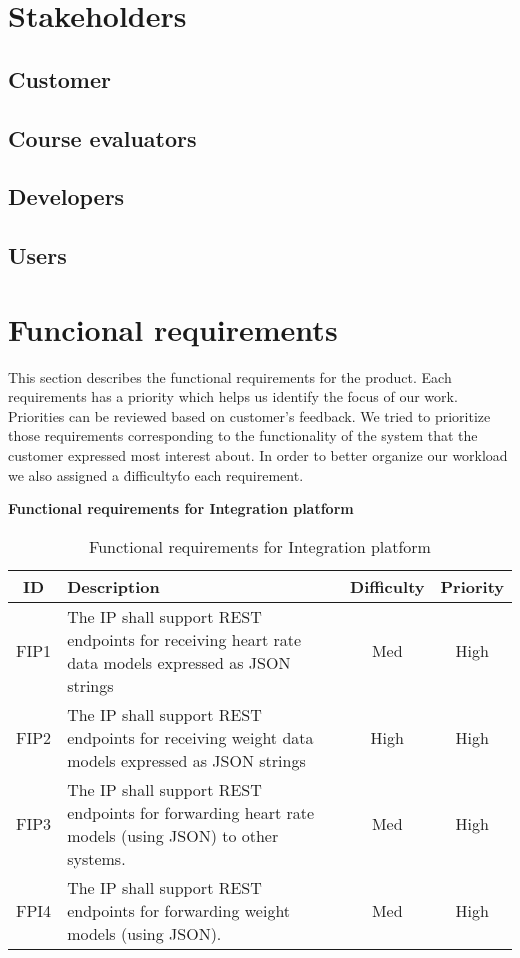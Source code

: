 
\section{Stakeholders}
\label{section:stakeholders}

\subsection{Customer}
\subsection{Course evaluators}
\subsection{Developers}
\subsection{Users}

\newpage
\section{Funcional requirements}
\label{section:functionalreq}

This section describes the functional requirements for the product.
Each requirements has a priority which helps us identify the focus of our work.
Priorities can be reviewed based on customer's feedback. We tried to prioritize those requirements corresponding to the functionality of the system that the customer expressed most interest about. In order to better organize our workload we also assigned a \'difficulty\' to each requirement.

\textbf{Functional requirements for Integration platform}

\begin{table}[h]
\begin{center}
\begin{tabular}{ | c | p{9cm} | c | c | }
  \hline
  ID & Description & Difficulty & Priority\\
  \hline\noalign{\smallskip}\noalign{\smallskip}\hline
  FIP1	& The IP shall support REST endpoints for receiving heart rate data models expressed as JSON strings	& Med	& High \\
  FIP2	& The IP shall support REST endpoints for receiving weight data models expressed as JSON strings 		& High	& High \\
  FIP3	& The IP shall support REST endpoints for forwarding heart rate models (using JSON) to other systems.	& Med	& High \\
  FPI4	& The IP shall support REST endpoints for forwarding weight models (using JSON).						& Med	& High \\
  \hline
\end{tabular}
\end{center}
\caption{Functional requirements for Integration platform}
\label{table:reqip}
\end{table}

